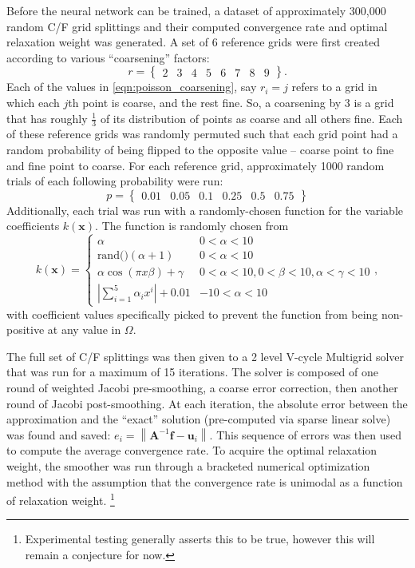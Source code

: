 \documentclass[review]{siamart190516}
\newcommand{\norm}[1]{\left\lVert#1\right\rVert}
\newcommand{\abs}[1]{\left\lvert#1\right\rvert}
\newcommand{\mat}[1]{\bm{{#1}}}
\renewcommand{\vec}[1]{\bm{{#1}}}
\begin{document}
Before the neural network can be trained, a dataset of approximately 300,000 random C/F grid splittings and their computed convergence rate and optimal relaxation weight was generated.  A set of $6$ reference grids were first created according to various ``coarsening'' factors:
%
\begin{equation} \label{eqn:poisson_coarsening}
  r = \begin{Bmatrix} 2 & 3 & 4 & 5 & 6 & 7 & 8 & 9\end{Bmatrix}.
\end{equation}
%
Each of the values in \ref{eqn:poisson_coarsening}, say $r_i = j$ refers to a grid in which each $j$th point is coarse, and the rest fine.  So, a coarsening by $3$ is a grid that has roughly $\frac{1}{3}$ of its distribution of points as coarse and all others fine.  Each of these reference grids was randomly permuted such that each grid point had a random probability of being flipped to the opposite value -- coarse point to fine and fine point to coarse.  For each reference grid, approximately 1000 random trials of each following probability were run:
%
\begin{equation} \label{eqn:poisson_probabilities}
  p = \begin{Bmatrix} 0.01 & 0.05 & 0.1 & 0.25 & 0.5 & 0.75 \end{Bmatrix}
\end{equation}
%
Additionally, each trial was run with a randomly-chosen function for the variable coefficients $k\left(\vec{x}\right)$.  The function is randomly chosen from
%
\begin{equation} \label{eqn:poisson_varcoefficients}
k\left(\vec{x}\right) = \begin{cases}
\alpha & 0 < \alpha < 10 \\
\text{rand()}\left(\alpha + 1\right) & 0 < \alpha < 10 \\
\alpha\cos\left(\pi x \beta\right) + \gamma & 0 < \alpha < 10, 0 < \beta < 10, \alpha < \gamma < 10\\
\abs{\sum_{i=1}^5 \alpha_i x^i} + 0.01 & -10 < \alpha < 10
\end{cases},
\end{equation}
%
with coefficient values specifically picked to prevent the function from being non-positive at any value in $\Omega$.

The full set of C/F splittings was then given to a 2 level V-cycle Multigrid solver that was run for a maximum of 15 iterations.  The solver is composed of one round of weighted Jacobi pre-smoothing, a coarse error correction, then another round of Jacobi post-smoothing.  At each iteration, the absolute error between the approximation and the ``exact'' solution (pre-computed via sparse linear solve) was found and saved: $e_i = \norm{\mat{A}^{-1}\vec{f} - \vec{u}_i}$.  This sequence of errors was then used to compute the average convergence rate.  To acquire the optimal relaxation weight, the smoother was run through a bracketed numerical optimization method with the assumption that the convergence rate is unimodal as a function of relaxation weight. \footnote{Experimental testing generally asserts this to be true, however this will remain a conjecture for now.}
\end{document}
